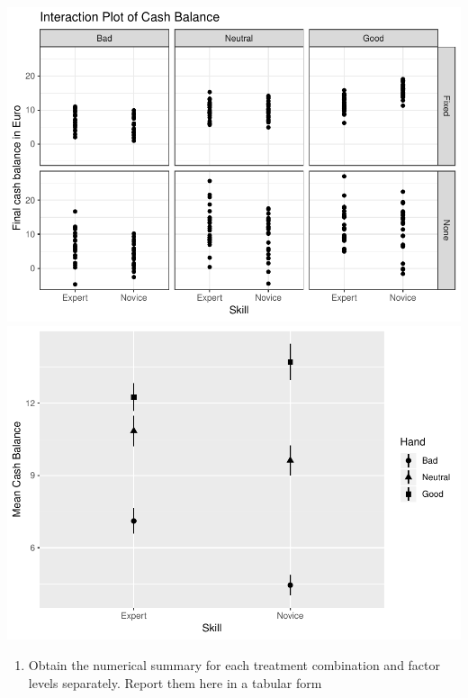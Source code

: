 \documentclass[]{article}
\providecommand{\tightlist}{%
  \setlength{\itemsep}{0pt}\setlength{\parskip}{0pt}}
\begin{document}
\includegraphics[width=0.3\linewidth]{lab7_stat565_files/figure-latex/unnamed-chunk-8-1}
\includegraphics[width=0.3\linewidth]{lab7_stat565_files/figure-latex/unnamed-chunk-8-2}

\begin{enumerate}
\def\labelenumi{(\alph{enumi})}
\setcounter{enumi}{1}
\tightlist
\item
  \textcolor[rgb]{0.5,0.5,0.5}{Obtain the numerical summary for each treatment combination and factor levels separately. Report them here in a tabular form}
\end{enumerate}
\end{document}
